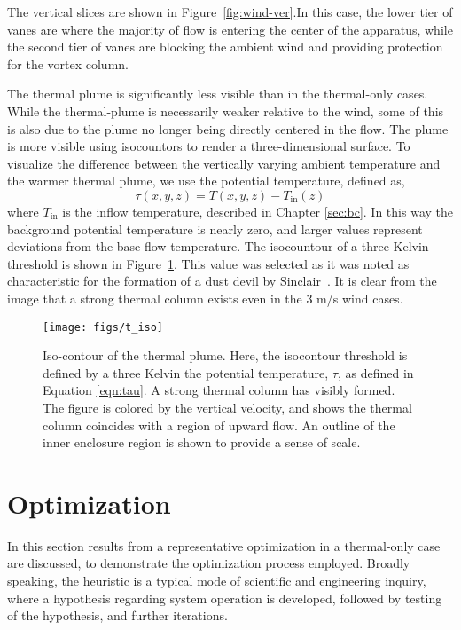 The vertical slices are shown in Figure~\ref{fig:wind-ver}.In this 
case, the lower tier of vanes are where the majority of flow is 
entering the center of the apparatus, while the second tier of vanes are
blocking the ambient wind and providing protection for the vortex column. 

The thermal plume is significantly less
visible than in the thermal-only cases. While the
thermal-plume is necessarily weaker relative to the wind, some of this
is also due to the plume no longer being directly centered in the
flow. The plume is more visible using isocountors to render a
three-dimensional surface. 
To visualize the difference between the vertically varying ambient
temperature and the warmer thermal plume, we use the potential
temperature, defined as, 
\begin{equation}
  \tau(x,y,z) = T(x,y,z) -T_{\text{in}}(z) 
   \label{eqn:tau}
\end{equation}
where $T_{\text{in}}$ is the inflow temperature, described
in Chapter \ref{sec:bc}. In this way the background potential
temperature is nearly zero, and larger values represent deviations from
the base flow temperature. The isocountour of a three Kelvin threshold
is  shown in Figure~\ref{fig:field_real}. This value was selected as
it was noted as characteristic for the formation of a dust devil by
Sinclair~\cite{Sinclair1969}. It is clear from the image that a 
strong thermal column exists even in the 3 m/s wind cases. 

%
%
  \begin{figure}[!htb]
   \begin{center}
    \texttt{[image: figs/t\_iso]}
    \caption{Iso-contour of the thermal plume. Here, the isocontour
    threshold is defined by a three Kelvin the potential temperature,
    $\tau$, as defined in Equation \ref{eqn:tau}. A strong thermal
    column has visibly formed. The figure is colored by the vertical
    velocity, and shows the thermal column coincides with a region of
    upward flow. An outline of the inner enclosure region is shown to
    provide a sense of scale.} 
    \label{fig:field_real}
   \end{center}
  \end{figure}

\section{Optimization}

In this section results from a representative optimization
in a thermal-only case are discussed, to demonstrate the optimization  
process employed. Broadly speaking, the heuristic is a typical mode of
scientific and engineering inquiry, where a hypothesis regarding system
operation is developed, followed by testing of the hypothesis, and further
iterations.  


